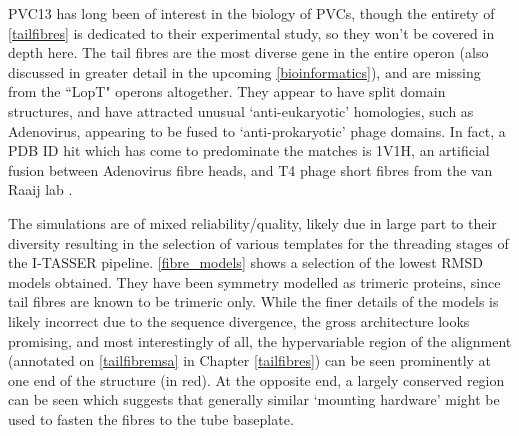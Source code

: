 PVC13 has long been of interest in the biology of PVCs, though the entirety of \vref{tailfibres} is dedicated to their experimental study, so they won't be covered in depth here. The tail fibres are the most diverse gene in the entire operon (also discussed in greater detail in the upcoming \ref{bioinformatics}), and are missing from the ``LopT" operons altogether. They appear to have split domain structures, and have attracted unusual `anti-eukaryotic' homologies, such as Adenovirus, appearing to be fused to `anti-prokaryotic' phage domains. In fact, a PDB ID hit which has come to predominate the matches is 1V1H, an artificial fusion between Adenovirus fibre heads, and T4 phage short fibres from the van Raaij lab \citep{Papanikolopoulou2004}.

The simulations are of mixed reliability/quality, likely due in large part to their diversity resulting in the selection of various templates for the threading stages of the I-TASSER pipeline. \vref{fibre_models} shows a selection of the lowest RMSD models obtained. They have been symmetry modelled as trimeric proteins, since tail fibres are known to be trimeric only. While the finer details of the models is likely incorrect due to the sequence divergence, the gross architecture looks promising, and most interestingly of all, the hypervariable region of the alignment (annotated on \vref{tailfibremsa} in Chapter \ref{tailfibres}) can be seen prominently at one end of the structure (in red). At the opposite end, a largely conserved region can be seen which suggests that generally similar `mounting hardware' might be used to fasten the fibres to the tube baseplate.

